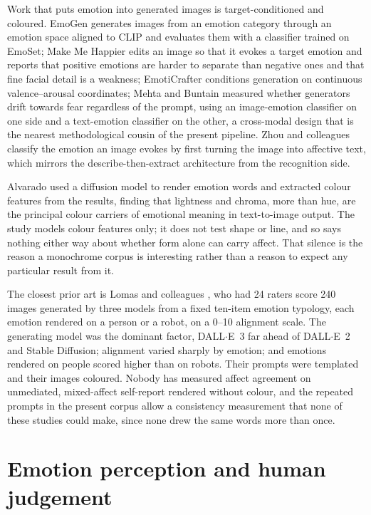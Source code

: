 Work that puts emotion into generated images is target-conditioned and coloured. EmoGen \cite{yang2024emogen} generates images from an emotion category through an emotion space aligned to CLIP and evaluates them with a classifier trained on EmoSet; Make Me Happier \cite{lin2024make} edits an image so that it evokes a target emotion and reports that positive emotions are harder to separate than negative ones and that fine facial detail is a weakness; EmotiCrafter \cite{dang2025emoticrafter} conditions generation on continuous valence--arousal coordinates; Mehta and Buntain \cite{mehta2024generating} measured whether generators drift towards fear regardless of the prompt, using an image-emotion classifier on one side and a text-emotion classifier on the other, a cross-modal design that is the nearest methodological cousin of the present pipeline. Zhou and colleagues \cite{zhou2025analyzing} classify the emotion an image evokes by first turning the image into affective text, which mirrors the describe-then-extract architecture from the recognition side.

Alvarado \cite{alvarado2025texttoimage} used a diffusion model to render emotion words and extracted colour features from the results, finding that lightness and chroma, more than hue, are the principal colour carriers of emotional meaning in text-to-image output. The study models colour features only; it does not test shape or line, and so says nothing either way about whether form alone can carry affect. That silence is the reason a monochrome corpus is interesting rather than a reason to expect any particular result from it.

The closest prior art is Lomas and colleagues \cite{lomas2024improved}, who had 24 raters score 240 images generated by three models from a fixed ten-item emotion typology, each emotion rendered on a person or a robot, on a 0--10 alignment scale. The generating model was the dominant factor, DALL$\cdot$E~3 far ahead of DALL$\cdot$E~2 and Stable Diffusion; alignment varied sharply by emotion; and emotions rendered on people scored higher than on robots. Their prompts were templated and their images coloured. Nobody has measured affect agreement on unmediated, mixed-affect self-report rendered without colour, and the repeated prompts in the present corpus allow a consistency measurement that none of these studies could make, since none drew the same words more than once.

\section{Emotion perception and human judgement}
\label{sec:lit-perception}

